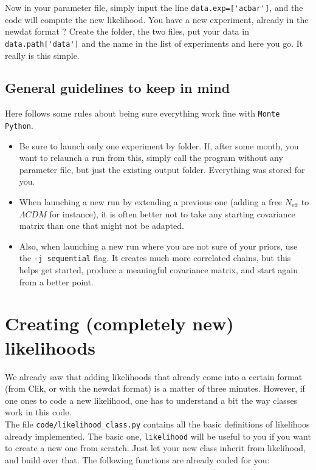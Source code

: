 \documentclass[10pt]{article}
\newcommand{\MP}{\texttt{Monte Python}}
\begin{document}
  Now in your parameter file, simply input the line \verb?data.exp=['acbar']?,
  and the code will compute the new likelihood. You have a new experiment,
  already in the newdat format ? Create the folder, the two files, put your
  data in \verb?data.path['data']? and the name in the list of experiments and
  here you go. It really is this simple.

  \subsection{General guidelines to keep in mind}

  Here follows some rules about being sure everything work fine with \MP.
\begin{itemize}
  \item Be sure to launch only one experiment by folder. If, after some month,
    you want to relaunch a run from this, simply call the program without any
    parameter file, but just the existing output folder. Everything was stored for you.
  \item When launching a new run by extending a previous one (adding a free
    $N_{\textrm{eff}}$ to $\Lambda CDM$ for instance), it is often better not to
    take any starting covariance matrix than one that might not be adapted.
  \item Also, when launching a new run where you are not sure of your priors,
    use the \verb?-j sequential? flag. It creates much more correlated chains,
    but this helps get started, produce a meaningful covariance matrix, and
    start again from a better point.
\end{itemize}
\newpage
\section{Creating (completely new) likelihoods}

  We already saw that adding likelihoods that already come into a certain format
  (from Clik, or with the newdat format) is a matter of three minutes. However,
  if one ones to code a new likelihood, one has to understand a bit the way
  classes work in this code.\\

  The file \verb?code/likelihood_class.py? contains all the basic definitions
  of likelihoos already implemented. The basic one, \verb?likelihood? will be
  useful to you if you want to create a new one from scratch. Just let your new
  class inherit from likelihood, and build over that. The following functions are already coded for you:\\
\end{document}
